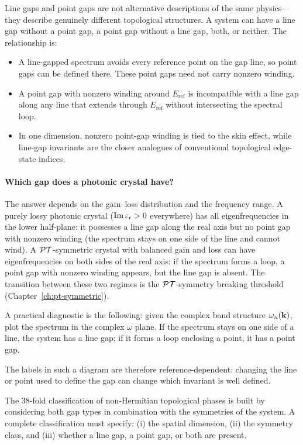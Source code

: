 Line gaps and point gaps are not alternative descriptions of the same
physics---they describe genuinely different topological structures. A
system can have a line gap without a point gap, a point gap without a
line gap, both, or neither. The relationship is:
\begin{itemize}
 \item A line-gapped spectrum avoids every reference point on the gap
 line, so point gaps can be defined there. These point gaps need not
 carry nonzero winding.
 \item A point gap with nonzero winding around $E_{\mathrm{ref}}$ is
 incompatible with a line gap along any line that extends through
 $E_{\mathrm{ref}}$ without intersecting the spectral loop.
 \item In one dimension, nonzero point-gap winding is tied to the skin
 effect, while line-gap invariants are the closer analogues of
 conventional topological edge-state indices.
\end{itemize}

\paragraph{Which gap does a photonic crystal have?}
The answer depends on the gain--loss distribution and the frequency
range. A purely lossy photonic crystal ($\operatorname{Im}\varepsilon_{\mathrm{r}} > 0$ everywhere)
has all eigenfrequencies in the lower half-plane: it possesses a line
gap along the real axis but no point gap with nonzero winding (the
spectrum stays on one side of the line and cannot wind). A
$\mathcal{PT}$-symmetric crystal with balanced gain and loss can have
eigenfrequencies on both sides of the real axis: if the spectrum
forms a loop, a point gap with nonzero winding appears, but the line
gap is absent. The transition between these two regimes is the
$\mathcal{PT}$-symmetry breaking threshold (Chapter~\ref{ch:pt-symmetric}).

A practical diagnostic is the following: given the complex band
structure $\omega_n(\mathbf{k})$, plot the spectrum in the complex $\omega$
plane. If the spectrum stays on one side of a line, the system has a
line gap; if it forms a loop enclosing a point, it has a point gap.

The labels in such a diagram are therefore reference-dependent: changing
the line or point used to define the gap can change which invariant is
well defined.

\begin{booknote}
The 38-fold classification of non-Hermitian topological phases is built
by considering both gap types in combination with the symmetries of the
system. A complete classification must specify: (i) the spatial
dimension, (ii) the symmetry class, and (iii) whether a line gap, a
point gap, or both are present.
\end{booknote}


